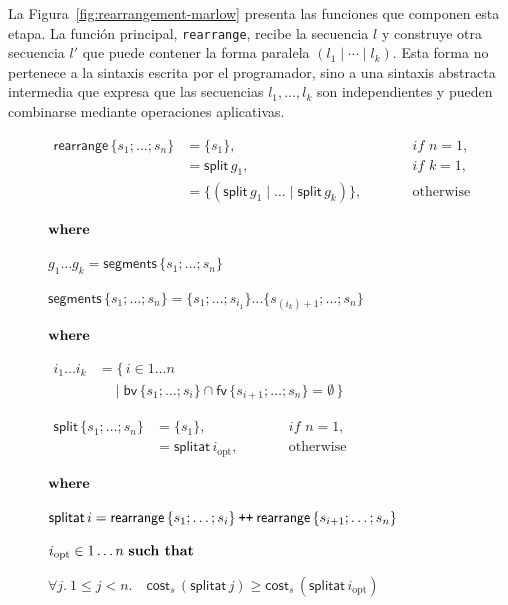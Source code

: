 La Figura~\ref{fig:rearrangement-marlow} presenta las funciones que componen esta etapa. La función principal, \texttt{rearrange}, recibe la secuencia $l$ y construye otra secuencia $l'$ que puede contener la forma paralela $(l_1\mid\cdots\mid l_k)$. Esta forma no pertenece a la sintaxis escrita por el programador, sino a una sintaxis abstracta intermedia que expresa que las secuencias $l_1,\ldots,l_k$ son independientes y pueden combinarse mediante operaciones aplicativas.

\begin{figure}[ht]
  \centering
  \begingroup
  \small
  \setlength{\jot}{2pt}
  \newcommand{\AdoFn}[1]{\mathsf{#1}}
  \newcommand{\AdoAppend}{\mathbin{\text{\ttfamily ++}}}
  \newcommand{\AdoLine}[2]{%
    \noindent\hspace*{#1}\(#2\)\par
  }
  \newcommand{\AdoBlockGap}{\vspace{1.5\baselineskip}}
  \begin{minipage}{0.6\textwidth}
  \setlength{\parindent}{0pt}
  \setlength{\parskip}{0pt}
  \raggedright
  \AdoLine{0pt}{
    \begin{alignedat}{2}
    \AdoFn{rearrange}\,\{s_1;\ldots;s_n\}
      &={} \{s_1\},
      &\qquad& \textit{if } n=1,\\
      &={} \AdoFn{split}\,g_1,
      && \textit{if } k=1,\\
      &={} \{(\AdoFn{split}\,g_1\mid\ldots\mid\AdoFn{split}\,g_k)\},
      && \text{otherwise}
    \end{alignedat}
  }
  \AdoLine{1.2em}{\text{\bfseries where}}
  \AdoLine{2.8em}{
    g_1\ldots g_k
      = \AdoFn{segments}\,\{s_1;\ldots;s_n\}
  }

  \AdoBlockGap
  \AdoLine{0pt}{
    \AdoFn{segments}\,\{s_1;\ldots;s_n\}
      = \{s_1;\ldots;s_{i_1}\}\ldots
        \{s_{(i_k)+1};\ldots;s_n\}
  }
  \AdoLine{1.2em}{\text{\bfseries where}}
  \AdoLine{2.8em}{
    \begin{aligned}
    i_1\ldots i_k
      &= \bigl\{\,i\in 1\ldots n\\
      &\quad \mathrel{|}
        \AdoFn{bv}\,\{s_1;\ldots;s_i\}
        \cap
        \AdoFn{fv}\,\{s_{i+1};\ldots;s_n\}
        =\emptyset\,\bigr\}
    \end{aligned}
  }

  \AdoBlockGap
  \AdoLine{0pt}{
    \begin{alignedat}{2}
    \AdoFn{split}\,\{s_1;\ldots;s_n\}
      &={} \{s_1\},
      &\qquad& \textit{if } n=1,\\
      &={} \AdoFn{splitat}\,i_{\mathrm{opt}},
      && \text{otherwise}
    \end{alignedat}
  }
  \AdoLine{1.2em}{\text{\bfseries where}}
  \AdoLine{2.8em}{
    \AdoFn{splitat}\,i
      = \AdoFn{rearrange}\,\{s_1;\ldots;s_i\}
        \AdoAppend
        \AdoFn{rearrange}\,\{s_{i+1};\ldots;s_n\}
  }
  \AdoLine{2.8em}{
    i_{\mathrm{opt}}\in 1\ldots n\ \text{\bfseries such that}
  }
  \AdoLine{3.6em}{
    \forall j.\ 1\leq j<n.\quad
    \AdoFn{cost}_s\,(\AdoFn{splitat}\,j)
      \geq \AdoFn{cost}_s\,(\AdoFn{splitat}\,i_{\mathrm{opt}})
  }


\end{minipage}
\end{figure}
